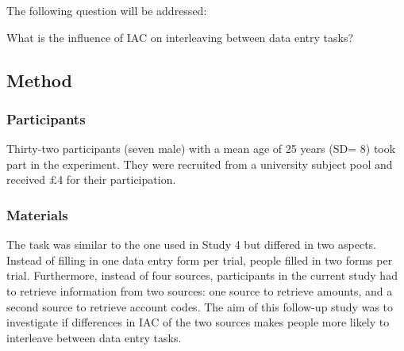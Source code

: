 \begin{table}
\begin{itemize}
The following question will be addressed:

What is the influence of IAC on interleaving between data entry tasks?

\subsection{Method}
\subsubsection{Participants}
Thirty-two participants (seven male) with a mean age of 25 years (SD= 8) took part in the experiment. They were recruited from a university subject pool and received $\pounds$4 for their participation.

\subsubsection{Materials}
The task was similar to the one used in Study 4 but differed in two aspects. Instead of filling in one data entry form per trial, people filled in two forms per trial. Furthermore, instead of four sources, participants in the current study had to retrieve information from two sources: one source to retrieve amounts, and a second source to retrieve account codes. The aim of this follow-up study was to investigate if differences in IAC of the two sources makes people more likely to interleave between data entry tasks.


\end{itemize}
\end{table}

